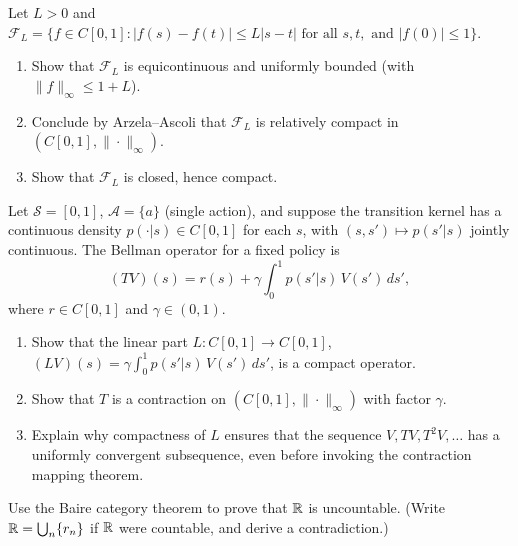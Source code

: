 \documentclass[11pt,a4paper]{article}
\begin{document}
\begin{exercise}
\label{ex:equicont}
Let $L > 0$ and
$\mathcal{F}_L = \{f \in C[0,1] : |f(s) - f(t)| \le L|s-t|
\text{ for all } s, t, \text{ and } |f(0)| \le 1\}$.
\begin{enumerate}[label=(\alph*),nosep]
    \item Show that $\mathcal{F}_L$ is equicontinuous and uniformly bounded
          (with $\|f\|_\infty \le 1 + L$).
    \item Conclude by Arzela--Ascoli that $\mathcal{F}_L$ is relatively
          compact in $(C[0,1], \|\cdot\|_\infty)$.
    \item Show that $\mathcal{F}_L$ is closed, hence compact.
\end{enumerate}
\end{exercise}

\begin{exercise}
\label{ex:bellman_compact}
Let $\mathcal{S} = [0,1]$, $\mathcal{A} = \{a\}$ (single action), and
suppose the transition kernel has a continuous density
$p(\cdot | s) \in C[0,1]$ for each $s$, with $(s, s') \mapsto p(s' | s)$
jointly continuous. The Bellman operator for a fixed policy is
\[
(TV)(s) = r(s) + \gamma \int_0^1 p(s' | s)\, V(s')\, ds',
\]
where $r \in C[0,1]$ and $\gamma \in (0,1)$.
\begin{enumerate}[label=(\alph*),nosep]
    \item Show that the linear part
          $L \colon C[0,1] \to C[0,1]$,
          $(LV)(s) = \gamma \int_0^1 p(s' | s)\, V(s')\, ds'$,
          is a compact operator.
    \item Show that $T$ is a contraction on $(C[0,1], \|\cdot\|_\infty)$
          with factor $\gamma$.
    \item Explain why compactness of $L$ ensures that the sequence
          $V, TV, T^2V, \ldots$ has a uniformly convergent subsequence,
          even before invoking the contraction mapping theorem.
\end{enumerate}
\end{exercise}

\begin{exercise}
\label{ex:baire_uncountable}
Use the Baire category theorem to prove that $\mathbb{R}$ is uncountable. (Write
$\mathbb{R} = \bigcup_{n} \{r_n\}$ if $\mathbb{R}$ were countable, and derive a
contradiction.)
\end{exercise}
\end{document}
